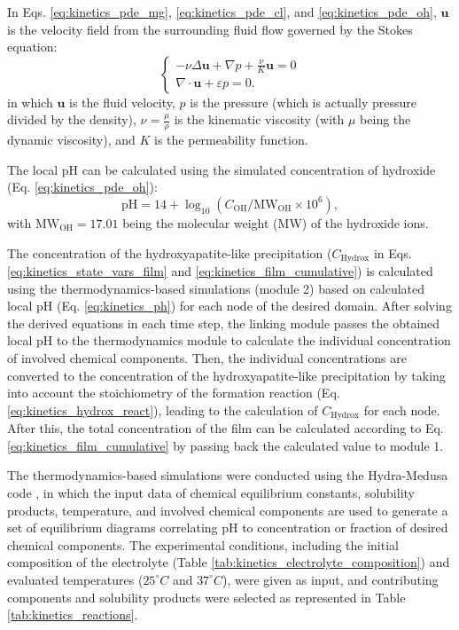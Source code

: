 In Eqs. \ref{eq:kinetics_pde_mg}, \ref{eq:kinetics_pde_cl}, and \ref{eq:kinetics_pde_oh}, $\mathbf{u}$ is the velocity field from the surrounding fluid flow governed by the Stokes equation:
\begin{equation} \label{eq:kinetics_stokes}
\left\{ {\begin{array}{*{20}{l}}
\displaystyle  {- \nu\Delta \mathbf{u} + \nabla p + \frac{\nu}{K} \mathbf{u} = 0} \\
\displaystyle  {\nabla\cdot\mathbf{u} + \varepsilon p = 0.}
\end{array}} \right.
\end{equation}
in which $\mathbf{u}$ is the fluid velocity, $p$ is the pressure (which is actually pressure divided by the density), $\nu = \frac{\mu}{\rho}$ is the kinematic viscosity (with $\mu$ being the dynamic viscosity), and $K$ is the permeability function.

The local pH can be calculated using the simulated concentration of hydroxide (Eq. \ref{eq:kinetics_pde_oh}):
\begin{equation} \label{eq:kinetics_ph}
\mathrm{pH} = 14 + \log_{10}\left(C_{\mathrm{OH}} / \mathrm{MW}_{\mathrm{OH}} \times 10^6\right),
\end{equation}
with $\mathrm{MW}_{\mathrm{OH}}=17.01$ being the molecular weight ({MW}) of the hydroxide ions.

The concentration of the hydroxyapatite-like precipitation ($C_{\mathrm{Hydrox}}$ in Eqs. \ref{eq:kinetics_state_vars_film} and \ref{eq:kinetics_film_cumulative}) is calculated using the thermodynamics-based simulations (module 2) based on calculated local pH (Eq. \ref{eq:kinetics_ph}) for each node of the desired domain. After solving the derived equations in each time step, the linking module passes the obtained local pH to the thermodynamics module to calculate the individual concentration of involved chemical components. Then, the individual concentrations are converted to the concentration of the hydroxyapatite-like precipitation by taking into account the stoichiometry of the formation reaction (Eq. \ref{eq:kinetics_hydrox_react}), leading to the calculation of $C_{\mathrm{Hydrox}}$ for each node. After this, the total concentration of the film can be calculated according to Eq. \ref{eq:kinetics_film_cumulative} by passing back the calculated value to module 1.

The thermodynamics-based simulations were conducted using the Hydra-Medusa code \cite{Ingri1967, Warnqvist1971, Eriksson1979}, in which the input data of chemical equilibrium constants, solubility products, temperature, and involved chemical components are used to generate a set of equilibrium diagrams correlating pH to concentration or fraction of desired chemical components. The experimental conditions, including the initial composition of the electrolyte (Table \ref{tab:kinetics_electrolyte_composition}) and evaluated temperatures ($25^{\circ}C$ and $37^{\circ}C$), were given as input, and contributing components and solubility products were selected as represented in Table \ref{tab:kinetics_reactions}.


